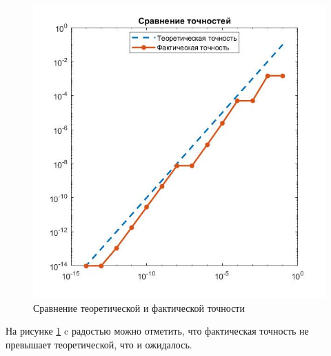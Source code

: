 \documentclass[a4paper]{article}
\begin{document}
\begin{figure}[h!]
\begin{center}
\includegraphics[scale=0.7]{сравнение точностей.jpg} 
\end{center}
\caption{Сравнение теоретической и фактической точности} \label{Рис3}
\end{figure}
На рисунке \ref{Рис3} c радостью можно отметить, что фактическая точность не превышает теоретической, что и ожидалось.\\
\end{document}
